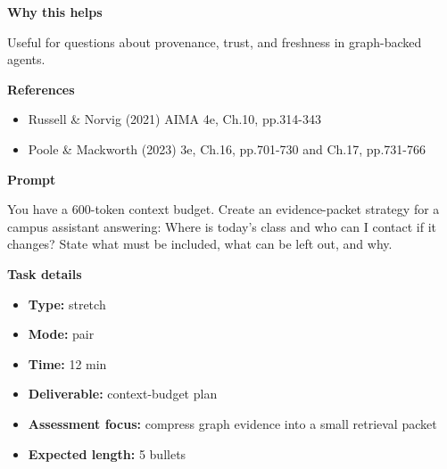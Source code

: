 \documentclass[11pt]{article}
\begin{document}
\begin{tcolorbox}[colback=white,colframe=MidnightBlue,title={Q3 Structured Problem},fonttitle=\bfseries,breakable]
{\large\bfseries\color{MidnightBlue} Why this helps}\par\medskip
Useful for questions about provenance, trust, and freshness in graph-backed agents.

{\large\bfseries\color{MidnightBlue} References}\par\medskip
\begin{itemize}\item Russell \& Norvig (2021) AIMA 4e, Ch.10, pp.314-343
\item Poole \& Mackworth (2023) 3e, Ch.16, pp.701-730 and Ch.17, pp.731-766\end{itemize}
\end{tcolorbox}

\begin{tcolorbox}[colback=white,colframe=MidnightBlue,title={Q4 Stretch Extension},fonttitle=\bfseries,breakable]
\begin{center}
\end{center}

{\large\bfseries\color{MidnightBlue} Prompt}\par\medskip
You have a 600-token context budget. Create an evidence-packet strategy for a campus assistant answering: Where is today's class and who can I contact if it changes? State what must be included, what can be left out, and why.

{\large\bfseries\color{MidnightBlue} Task details}\par\medskip
\begin{itemize}\item \textbf{Type:} stretch
\item \textbf{Mode:} pair
\item \textbf{Time:} 12 min
\item \textbf{Deliverable:} context-budget plan
\item \textbf{Assessment focus:} compress graph evidence into a small retrieval packet
\item \textbf{Expected length:} 5 bullets\end{itemize}


\end{tcolorbox}
\end{document}
